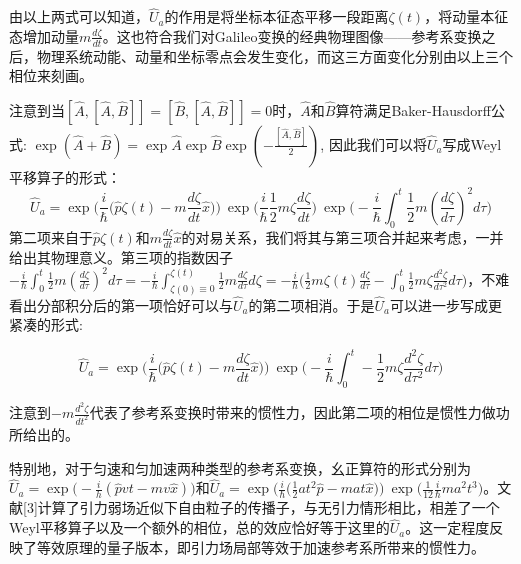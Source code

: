 \documentclass[a4paper]{article}
\begin{document}
        由以上两式可以知道，$\hat{U}_a$的作用是将坐标本征态平移一段距离$\zeta(t)$，将动量本征态增加动量$m\frac{d \zeta}{dt}$。这也符合我们对Galileo变换的经典物理图像——参考系变换之后，物理系统动能、动量和坐标零点会发生变化，而这三方面变化分别由以上三个相位来刻画。

        注意到当$[\hat{A}, [\hat{A}, \hat{B}]]=[\hat{B}, [\hat{A}, \hat{B}]]=0$时，$\hat{A}$和$\hat{B}$算符满足Baker-Hausdorff公式: $\exp(\hat{A}+\hat{B})=\exp\hat{A} \exp\hat{B} \exp(-\frac{[\hat{A}, \hat{B}]}{2})$, 因此我们可以将$\hat{U}_a$写成Weyl平移算子的形式：
        \begin{equation}
            \hat{U}_a=\exp\bigg(\frac{i}{\hbar}\bigg(\hat{p}\zeta(t)-m\frac{d\zeta}{dt}\hat{x} \bigg) \bigg)\ \exp\bigg(\frac{i}{\hbar}\frac{1}{2}m\zeta\frac{d\zeta}{dt} \bigg)\ \exp\bigg(-\frac{i}{\hbar}\int_0^t\frac{1}{2}m(\frac{d \zeta}{d\tau})^2 d\tau \bigg)
        \end{equation}
        第二项来自于$\hat{p}\zeta(t)$和$m\frac{d\zeta}{dt}\hat{x}$的对易关系，我们将其与第三项合并起来考虑，一并给出其物理意义。第三项的指数因子$-\frac{i}{\hbar}\int_0^t\frac{1}{2}m(\frac{d \zeta}{d\tau})^2 d\tau = -\frac{i}{\hbar}\int_{\zeta(0)\equiv 0}^{\zeta(t)}\frac{1}{2}m\frac{d \zeta}{d\tau} d\zeta = -\frac{i}{\hbar}\bigg(\frac{1}{2}m\zeta(t)\frac{d \zeta}{d\tau}-\int_0^t\frac{1}{2}m\zeta\frac{d^2\zeta}{d\tau^2} d\tau\bigg)$，不难看出分部积分后的第一项恰好可以与$\hat{U}_a$的第二项相消。于是$\hat{U}_a$可以进一步写成更紧凑的形式:

        \begin{equation}
            \hat{U}_a = \exp\bigg(\frac{i}{\hbar}\bigg(\hat{p}\zeta(t)-m\frac{d\zeta}{dt}\hat{x} \bigg) \bigg)\ \exp\bigg( -\frac{i}{\hbar}\int_0^t-\frac{1}{2}m\zeta\frac{d^2\zeta}{d\tau^2} d\tau\bigg)
        \end{equation}

        注意到$-m\frac{d^2\zeta}{dt^2}$代表了参考系变换时带来的惯性力，因此第二项的相位是惯性力做功所给出的。
        
        特别地，对于匀速和匀加速两种类型的参考系变换，幺正算符的形式分别为$\hat{U}_a=\exp\big(-\frac{i}{h}(\hat{p}vt-mv\hat{x})\big)$和$\hat{U}_a=\exp\big(\frac{i}{\hbar}\big(\frac{1}{2}at^2\hat{p}-mat\hat{x} \big)\big)\ \exp\big(\frac{1}{12}\frac{i}{\hbar}ma^2t^3\big)$。文献[3]计算了引力弱场近似下自由粒子的传播子，与无引力情形相比，相差了一个Weyl平移算子以及一个额外的相位，总的效应恰好等于这里的$\hat{U}_a$。这一定程度反映了等效原理的量子版本，即引力场局部等效于加速参考系所带来的惯性力。
\end{document}
